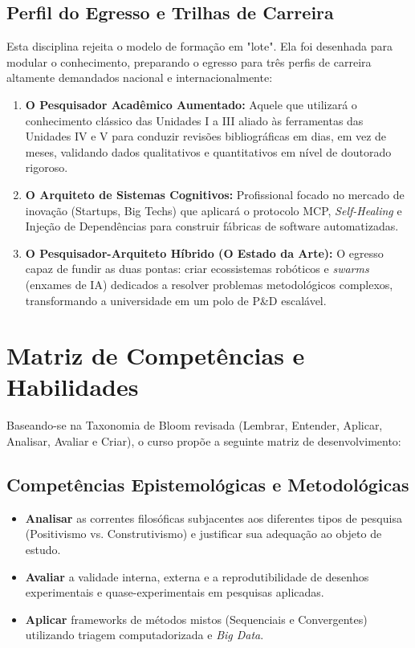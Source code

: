\documentclass[12pt,a4paper]{article}
\begin{document}
\subsection{Perfil do Egresso e Trilhas de Carreira}
Esta disciplina rejeita o modelo de formação em "lote". Ela foi desenhada para modular o conhecimento, preparando o egresso para três perfis de carreira altamente demandados nacional e internacionalmente:
\begin{enumerate}
    \item \textbf{O Pesquisador Acadêmico Aumentado:} Aquele que utilizará o conhecimento clássico das Unidades I a III aliado às ferramentas das Unidades IV e V para conduzir revisões bibliográficas em dias, em vez de meses, validando dados qualitativos e quantitativos em nível de doutorado rigoroso.
    \item \textbf{O Arquiteto de Sistemas Cognitivos:} Profissional focado no mercado de inovação (Startups, Big Techs) que aplicará o protocolo MCP, \textit{Self-Healing} e Injeção de Dependências para construir fábricas de software automatizadas.
    \item \textbf{O Pesquisador-Arquiteto Híbrido (O Estado da Arte):} O egresso capaz de fundir as duas pontas: criar ecossistemas robóticos e \textit{swarms} (enxames de IA) dedicados a resolver problemas metodológicos complexos, transformando a universidade em um polo de P\&D escalável.
\end{enumerate}

\section{Matriz de Competências e Habilidades}

Baseando-se na Taxonomia de Bloom revisada (Lembrar, Entender, Aplicar, Analisar, Avaliar e Criar), o curso propõe a seguinte matriz de desenvolvimento:

\subsection{Competências Epistemológicas e Metodológicas}
\begin{itemize}
    \item \textbf{Analisar} as correntes filosóficas subjacentes aos diferentes tipos de pesquisa (Positivismo vs. Construtivismo) e justificar sua adequação ao objeto de estudo.
    \item \textbf{Avaliar} a validade interna, externa e a reprodutibilidade de desenhos experimentais e quase-experimentais em pesquisas aplicadas.
    \item \textbf{Aplicar} frameworks de métodos mistos (Sequenciais e Convergentes) utilizando triagem computadorizada e \textit{Big Data}.
\end{itemize}
\end{document}
